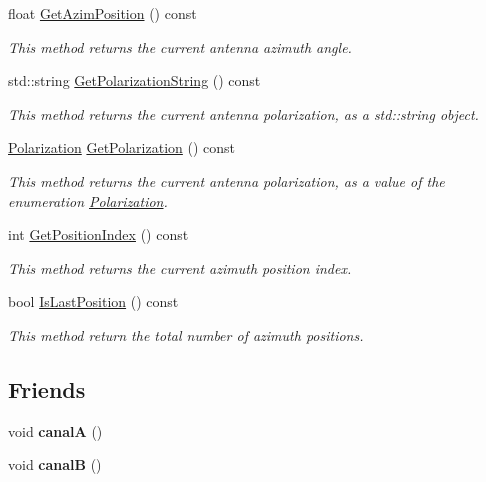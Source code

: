 \begin{DoxyCompactItemize}
\mbox{\label{classAntennaPositioner_a72cb61d647eaad277f256b3ca9555f8a}} 
float \hyperlink{classAntennaPositioner_a72cb61d647eaad277f256b3ca9555f8a}{Get\+Azim\+Position} () const
\begin{DoxyCompactList}\small\item\em This method returns the current antenna azimuth angle. \end{DoxyCompactList}\item 
std\+::string \hyperlink{classAntennaPositioner_a897b759fa711bd8a4261e57177e3db1c}{Get\+Polarization\+String} () const
\begin{DoxyCompactList}\small\item\em This method returns the current antenna polarization, as a {\ttfamily std\+::string} object. \end{DoxyCompactList}\item 
\hyperlink{AntennaPositioning_8h_a55887c7bc32d70c0308472ff4de3e282}{Polarization} \hyperlink{classAntennaPositioner_a590e07740567be77f677d822cf63b69a}{Get\+Polarization} () const
\begin{DoxyCompactList}\small\item\em This method returns the current antenna polarization, as a value of the enumeration \hyperlink{AntennaPositioning_8h_a55887c7bc32d70c0308472ff4de3e282}{Polarization}. \end{DoxyCompactList}\item 
\mbox{\label{classAntennaPositioner_acec3d655aa86c9a819b2a4f16590573b}} 
int \hyperlink{classAntennaPositioner_acec3d655aa86c9a819b2a4f16590573b}{Get\+Position\+Index} () const
\begin{DoxyCompactList}\small\item\em This method returns the current azimuth position index. \end{DoxyCompactList}\item 
bool \hyperlink{classAntennaPositioner_a512104fe937395e266284eded6a8359d}{Is\+Last\+Position} () const
\begin{DoxyCompactList}\small\item\em This method return the total number of azimuth positions. \end{DoxyCompactList}\end{DoxyCompactItemize}
\subsection*{Friends}
\begin{DoxyCompactItemize}
\item 
\mbox{\label{classAntennaPositioner_a9cc03f0eb0621d563accfce76ce7eeee}} 
void {\bfseries canalA} ()
\item 
\mbox{\label{classAntennaPositioner_a03e4c5761544a2e9305d2cc4d70c202d}} 
void {\bfseries canalB} ()
\end{DoxyCompactItemize}


